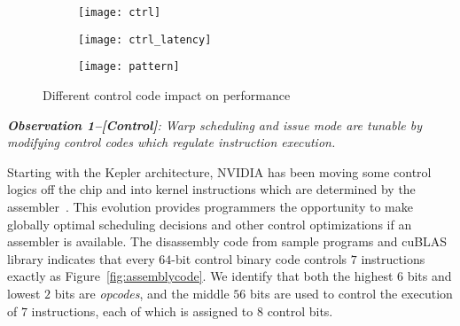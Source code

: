 \begin{figure*}
    \begin{subfigure}[htbp]{0.3\textwidth}
        \texttt{[image: ctrl]}
        \label{fig:control_throughput}
    \end{subfigure}
    \begin{subfigure}[htbp]{0.3\textwidth}
        \texttt{[image: ctrl\_latency]}
        \label{fig:control_latency}
    \end{subfigure}
    \begin{subfigure}[htbp]{0.3\textwidth}
        \texttt{[image: pattern]}
        \label{fig:control_pattern}
    \end{subfigure}
    \caption{Different control code impact on performance}
    \label{fig:control_code}
\end{figure*}


{\em {\bf Observation 1--[Control]}: 
Warp scheduling and issue mode are tunable by modifying control codes which regulate instruction execution.}

Starting with the Kepler architecture, NVIDIA has been moving some control logics off the chip and into kernel 
instructions which are determined by the assembler~\cite{lai,maxas}. This evolution provides programmers the opportunity to 
make globally optimal scheduling decisions and other control optimizations if an assembler is available. The disassembly code from sample programs and cuBLAS library indicates that every $64$-bit control binary code controls $7$ instructions exactly as Figure~\ref{fig:assemblycode}.
We identify that both the highest $6$ bits and lowest 
$2$ bits are {\em opcodes}, and the middle $56$ bits are used to control the execution of $7$ 
instructions, each of which is assigned to $8$ control bits.

